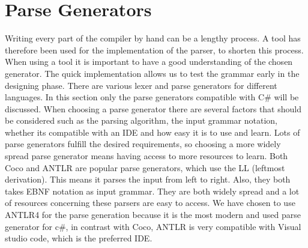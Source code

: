 \section{Parse Generators}
Writing every part of the compiler by hand can be a lengthy process. A tool has therefore been used for the implementation of the parser, to shorten this process. When using a tool it is important to have a good understanding of the chosen generator. The quick implementation allows us to test the grammar early in the designing phase.
There are various lexer and parse generators for different languages. In this section only the parse generators compatible with C# 
will be discussed. When choosing a parse generator there are several factors that should be considered such as the parsing algorithm, the input grammar notation,
whether its compatible with an IDE and how easy it is to use and learn. Lots of parse generators fulfill the desired requirements, 
so choosing a more widely spread parse generator means having access to more resources to learn. Both Coco and ANTLR are popular parse generators, which use the LL (leftmost derivation). This means it parses the input from left to right. 
Also, they both takes EBNF notation as input grammar. They are both widely spread and a lot of resources concerning these parsers are easy to access. \newline
We have chosen to use ANTLR4 for the parse generation because it is the most modern and used parse generator for c#, in contrast with Coco, ANTLR is very compatible with Visual studio code, which is the preferred IDE. 
